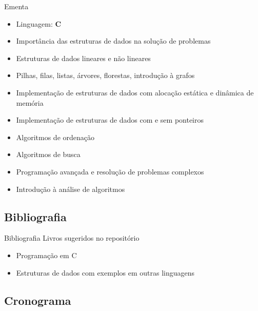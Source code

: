 \documentclass[10pt]{beamer}
\begin{document}
\begin{frame}{Ementa}
    \begin{itemize}
        \item Linguagem: \textbf{C}
        \item Importância das estruturas de dados na solução de problemas
        \item Estruturas de dados lineares e não lineares
        \item Pilhas, filas, listas, árvores, florestas, introdução à grafos
        \item Implementação de estruturas de dados com alocação estática e dinâmica de memória
        \item Implementação de estruturas de dados com e sem ponteiros
        \item Algoritmos de ordenação
        \item Algoritmos de busca
        \item Programação avançada e resolução de problemas complexos
        \item Introdução à análise de algoritmos
    \end{itemize}
\end{frame}

\subsection{Bibliografia}

\begin{frame}{Bibliografia}
    \huge
    Livros sugeridos no \alert{repositório}
    
    \Large
    \begin{itemize}
        \item Programação em C
        \item Estruturas de dados com exemplos em outras linguagens
    \end{itemize}
\end{frame}

\subsection{Cronograma}
\end{document}
